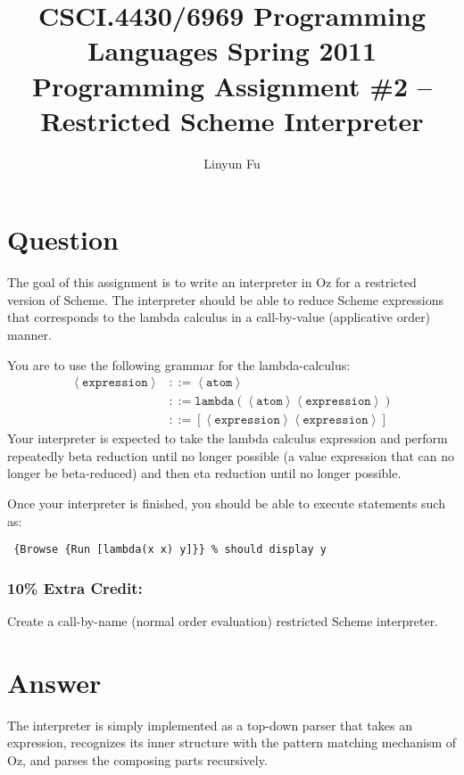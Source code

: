 \documentclass[12pt,letterpaper]{article}
\author{Linyun Fu}
\title{CSCI.4430/6969 Programming Languages Spring 2011\\
Programming Assignment \#2 -- Restricted Scheme Interpreter}
\begin{document}
\maketitle
\part*{Question}
The goal of this assignment is to write an interpreter in Oz for a restricted version of Scheme. The interpreter should be able to reduce Scheme expressions that corresponds to the lambda calculus in a call-by-value (applicative order) manner.

You are to use the following grammar for the lambda-calculus:
\begin{align}
\nonumber\left<\texttt{expression}\right> & ::= \left<\texttt{atom}\right>\\
\nonumber & ::= \texttt{lambda}(\left<\texttt{atom}\right> \left<\texttt{expression}\right>)\\
\nonumber & ::= [\left<\texttt{expression}\right> \left<\texttt{expression}\right>]
\end{align}
Your interpreter is expected to take the lambda calculus expression and perform repeatedly beta reduction until no longer possible (a value expression that can no longer be beta-reduced) and then eta reduction until no longer possible.

Once your interpreter is finished, you should be able to execute statements such as:

\tt
\{Browse \{Run [lambda(x x) y]\}\} \% should display y
\rm

\section*{10\% Extra Credit:}

Create a call-by-name (normal order evaluation) restricted Scheme interpreter.

\part*{Answer}
The interpreter is simply implemented as a top-down parser that takes an expression, recognizes its inner structure with the pattern matching mechanism of Oz, and parses the composing parts recursively. 
\end{document}
